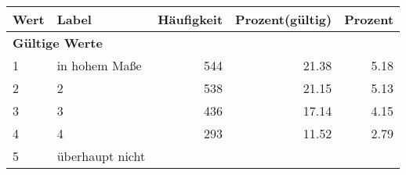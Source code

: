      \begin{longtable}{lXrrr}
     \toprule
     \textbf{Wert} & \textbf{Label} & \textbf{Häufigkeit} & \textbf{Prozent(gültig)} & \textbf{Prozent} \\
     \endhead
     \midrule
     \multicolumn{5}{l}{\textbf{Gültige Werte}}\\

     1 &
     \multicolumn{1}{X}{ in hohem Maße   } &


       \num{544} &
       \num[round-mode=places,round-precision=2]{21.38} &
         \num[round-mode=places,round-precision=2]{5.18} \\

     2 &
     \multicolumn{1}{X}{ 2   } &


       \num{538} &
       \num[round-mode=places,round-precision=2]{21.15} &
         \num[round-mode=places,round-precision=2]{5.13} \\

     3 &
     \multicolumn{1}{X}{ 3   } &


       \num{436} &
       \num[round-mode=places,round-precision=2]{17.14} &
         \num[round-mode=places,round-precision=2]{4.15} \\

     4 &
     \multicolumn{1}{X}{ 4   } &


       \num{293} &
       \num[round-mode=places,round-precision=2]{11.52} &
         \num[round-mode=places,round-precision=2]{2.79} \\

     5 &
     \multicolumn{1}{X}{ überhaupt nicht   } &



\end{longtable}
